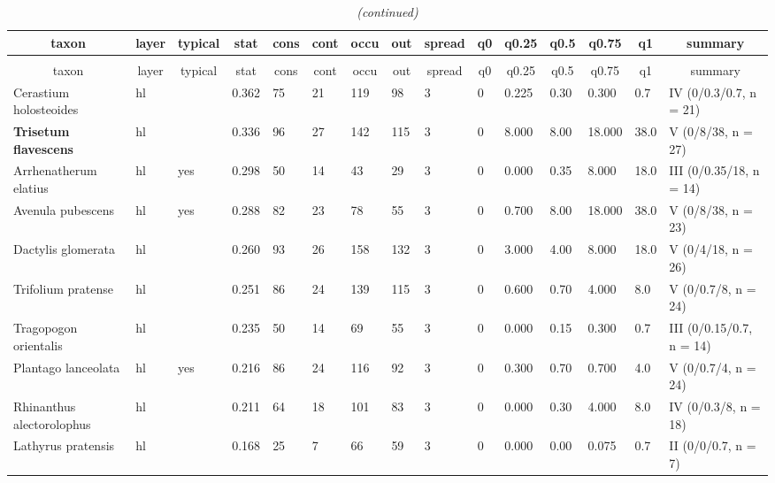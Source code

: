 \documentclass[9pt]{article}
\begin{document}
\setlongtables\begin{longtable}{lllllllllllllll}\caption{Partion summary for cluster 1 consisting out of 28 plots.} \tabularnewline
\toprule
\multicolumn{1}{c}{taxon}&\multicolumn{1}{c}{layer}&\multicolumn{1}{c}{typical}&\multicolumn{1}{c}{stat}&\multicolumn{1}{c}{cons}&\multicolumn{1}{c}{cont}&\multicolumn{1}{c}{occu}&\multicolumn{1}{c}{out}&\multicolumn{1}{c}{spread}&\multicolumn{1}{c}{q0}&\multicolumn{1}{c}{q0.25}&\multicolumn{1}{c}{q0.5}&\multicolumn{1}{c}{q0.75}&\multicolumn{1}{c}{q1}&\multicolumn{1}{c}{summary}\tabularnewline
\midrule
\endfirsthead\caption[]{\em (continued)} \tabularnewline
\midrule
\multicolumn{1}{c}{taxon}&\multicolumn{1}{c}{layer}&\multicolumn{1}{c}{typical}&\multicolumn{1}{c}{stat}&\multicolumn{1}{c}{cons}&\multicolumn{1}{c}{cont}&\multicolumn{1}{c}{occu}&\multicolumn{1}{c}{out}&\multicolumn{1}{c}{spread}&\multicolumn{1}{c}{q0}&\multicolumn{1}{c}{q0.25}&\multicolumn{1}{c}{q0.5}&\multicolumn{1}{c}{q0.75}&\multicolumn{1}{c}{q1}&\multicolumn{1}{c}{summary}\tabularnewline
\midrule
\endhead
\midrule
\endfoot
\label{as.matrix}
Cerastium holosteoides&hl&&0.362&75&21&119& 98&3&0&0.225&0.30& 0.300& 0.7&IV (0/0.3/0.7, n = 21)\tabularnewline
\textbf{ Trisetum flavescens }&hl&&0.336&96&27&142&115&3&0&8.000&8.00&18.000&38.0&V (0/8/38, n = 27)\tabularnewline
Arrhenatherum elatius&hl&yes&0.298&50&14& 43& 29&3&0&0.000&0.35& 8.000&18.0&III (0/0.35/18, n = 14)\tabularnewline
Avenula pubescens&hl&yes&0.288&82&23& 78& 55&3&0&0.700&8.00&18.000&38.0&V (0/8/38, n = 23)\tabularnewline
Dactylis glomerata&hl&&0.260&93&26&158&132&3&0&3.000&4.00& 8.000&18.0&V (0/4/18, n = 26)\tabularnewline
Trifolium pratense&hl&&0.251&86&24&139&115&3&0&0.600&0.70& 4.000& 8.0&V (0/0.7/8, n = 24)\tabularnewline
Tragopogon orientalis&hl&&0.235&50&14& 69& 55&3&0&0.000&0.15& 0.300& 0.7&III (0/0.15/0.7, n = 14)\tabularnewline
Plantago lanceolata&hl&yes&0.216&86&24&116& 92&3&0&0.300&0.70& 0.700& 4.0&V (0/0.7/4, n = 24)\tabularnewline
Rhinanthus alectorolophus&hl&&0.211&64&18&101& 83&3&0&0.000&0.30& 4.000& 8.0&IV (0/0.3/8, n = 18)\tabularnewline
Lathyrus pratensis&hl&&0.168&25& 7& 66& 59&3&0&0.000&0.00& 0.075& 0.7&II (0/0/0.7, n = 7)\tabularnewline

\end{longtable}
\end{document}
